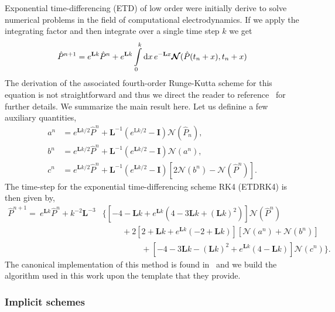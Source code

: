 \documentclass[11pt]{article}
\newcommand{\Phat}{\hat{P}}
\newcommand{\mN}{\bm{\mathcal{N}}}
\begin{document}
Exponential time-differencing (ETD) of low order were initially derive to solve numerical problems in the field of computational electrodynamics. If we apply the integrating factor and then integrate over a single time step $k$ we get
\begin{align}
    \Phat^{n+1} = e^{\vb{L}k}\Phat^{n} + e^{\vb{L}k}\int\limits_{0}^{k}\dd{x} e^{-\vb{L}x}\mN(\Phat(t_{n}+x),t_{n}+x)
\end{align}
The derivation of the associated fourth-order Runge-Kutta scheme for this equation is not straightforward and thus we direct the reader to reference~\cite{cox2002} for further details. We summarize the main result here. Let us definine a few auxiliary quantities,
\begin{subequations}
    \begin{align}
    a^{n} &= e^{\mathbf{L} k / 2} \Phat^{n}+\mathbf{L}^{-1}\left(e^{\mathrm{L} k / 2}-\mathbf{I}\right) \mN\left(\Phat_{n}\right), \\ 
    b^{n} &= e^{\mathbf{L} k / 2} \Phat^{n}+\mathbf{L}^{-1}\left(e^{\mathbf{L} k / 2}-\mathbf{I}\right) \mN\left(a^{n}\right), \\ 
    c^{n} &= e^{\mathbf{L} k / 2} \Phat^{n}+\mathbf{L}^{-1}\left(e^{\mathbf{L} k / 2}-\mathbf{I}\right)\left[2 \mN\left(b^{n}\right)-\mN\left(\Phat^{n}\right)\right].
    \end{align}
\end{subequations}
The time-step for the exponential time-differencing scheme RK4 (ETDRK4) is then given by,
\begin{align}
    \Phat^{n+1}=\ e^{\mathbf{L} k} \Phat^{n}+k^{-2} \mathbf{L}^{-3}&\Bigg\{\left[-4-\mathbf{L} k+e^{\mathbf{L} k}\left(4-3 \mathbf{L} k+(\mathbf{L} k)^{2}\right)\right] \mN\left(\Phat^{n}\right) \nonumber\\ 
    &\hspace{1cm}+2\left[2+\mathbf{L} k+e^{\mathbf{L} k}(-2+\mathbf{L} k)\right]\left[\mN\left(a^{n}\right)+\mN\left(b^{n}\right)\right] \nonumber\\
    &\hspace{2cm}+\left[-4-3 \mathbf{L} k-(\mathbf{L} k)^{2}+e^{\mathbf{L}k}(4-\mathbf{L} k)\right] \mN\left(c^{n}\right)\Bigg\}. \label{eq:etd_scheme}
\end{align}
The canonical implementation of this method is found in~\cite{kassam2005} and we build the algorithm used in this work upon the template that they provide. 

\subsubsection{Implicit schemes}
\end{document}
